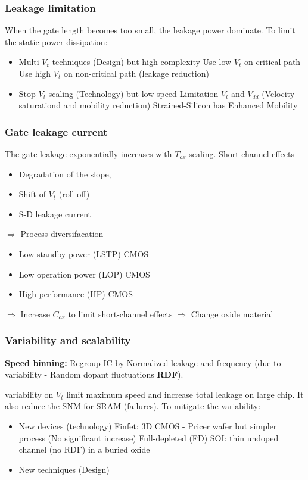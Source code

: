 \subsubsection{Leakage limitation}
When the gate length becomes too small, the leakage power dominate. To limit the static power dissipation:
\begin{itemize}
  \item Multi \(V_t\) techniques (Design) but high complexity
  \subitem Use low \(V_t\) on critical path
  \subitem Use high \(V_t\) on non-critical path (leakage reduction)
  \item Stop \(V_t\) scaling (Technology) but low speed
    \subitem Limitation \(V_t\) and \(V_{dd}\) (Velocity saturationd and mobility reduction)
    \subitem Strained-Silicon has Enhanced Mobility
\end{itemize}

\subsubsection{Gate leakage current}
The gate leakage exponentially increases with \(T_{ox}\) scaling. Short-channel effects
  \begin{itemize}
  \item Degradation of the slope,
  \item Shift of \(V_t\) (roll-off)
  \item S-D leakage current
  \end{itemize}

  \(\Rightarrow\) Process diversifacation
  \begin{itemize}
    \item Low standby power (LSTP) CMOS
    \item Low operation power (LOP) CMOS
    \item High performance (HP) CMOS
  \end{itemize}


  \(\Rightarrow\) Increase \(C_{ox}\) to limit short-channel effects \(\Rightarrow\) Change oxide material


\subsubsection{Variability and scalability}
\textbf{Speed binning:} Regroup IC by Normalized leakage and frequency (due to variability - Random dopant fluctuations \textbf{RDF}).

variability on \(V_t\) limit maximum speed and increase total leakage on large chip. It also reduce the SNM for SRAM (failures). To mitigate the variability:
\begin{itemize}
  \item New devices (technology)
    \subitem Finfet: 3D CMOS - Pricer wafer but simpler process (No significant increase)
    \subitem Full-depleted (FD) SOI: thin undoped channel (no RDF) in a buried oxide
  \item New techniques (Design)
\end{itemize}


